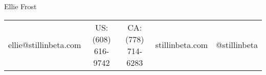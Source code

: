\centering
\textmd{\Huge Ellie Frost} \\
\begin{tabular}{c | c | c | c | c}
ellie@stillinbeta.com &
US: (608) 616-9742 &
CA: (778) 714-6283 &
stillinbeta.com &
@stillinbeta
\end{tabular}

\raggedright
